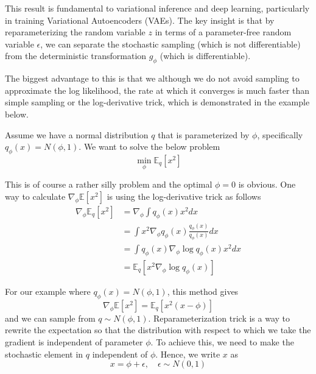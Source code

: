   This result is fundamental to variational inference and deep learning, particularly in training Variational Autoencoders (VAEs). The key insight is that by reparameterizing the random variable $z$ in terms of a parameter-free random variable $\epsilon$, we can separate the stochastic sampling (which is not differentiable) from the deterministic transformation $g_\phi$ (which is differentiable).

  The biggest advantage to this is that we although we do not avoid sampling to approximate the log likelihood, the rate at which it converges is much faster than simple sampling or the log-derivative trick, which is demonstrated in the example below. 

  \begin{example}[Gradient of Expection of $f(x) = x^2$ w.r.t. Gaussian]
    Assume we have a normal distribution $q$ that is parameterized by $\phi$, specifically
    $q_\phi(x) = N(\phi, 1)$. We want to solve the below problem
    \begin{equation}
      \min_\phi \mathbb{E}_q[x^2]
    \end{equation}

    This is of course a rather silly problem and the optimal $\phi = 0$ is obvious. One way to calculate $\nabla_\phi \mathbb{E}[x^2]$ is using the log-derivative trick as follows
    \begin{align}
      \nabla_\phi \mathbb{E}_q[x^2] &= \nabla_\phi\int q_\phi(x)x^2dx \\
      &= \int x^2\nabla_\phi q_\phi(x)\frac{q_\phi(x)}{q_\phi(x)}dx \\
      &= \int q_\phi(x)\nabla_\phi\log q_\phi(x)x^2dx \\
      &= \mathbb{E}_q[x^2\nabla_\phi\log q_\phi(x)]
    \end{align}

    For our example where $q_\phi(x) = N(\phi, 1)$, this method gives
    \begin{equation}
      \nabla_\phi \mathbb{E}[x^2] = \mathbb{E}_q[x^2(x-\phi)]
    \end{equation}
    and we can sample from $q \sim N(\phi, 1)$. Reparameterization trick is a way to rewrite the expectation so that the distribution with respect to which we take the gradient is independent of parameter $\phi$. To achieve this, we need to make the stochastic element in $q$ independent of $\phi$. Hence, we write $x$ as
    \begin{equation}
      x = \phi+ \epsilon, \quad \epsilon \sim N(0,1)
    \end{equation}


\end{example}
